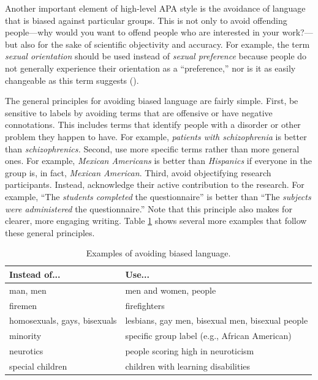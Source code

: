 \documentclass[
]{krantz}
\begin{document}
Another important element of high-level APA style is the avoidance of language that is biased against particular groups. This is not only to avoid offending people---why would you want to offend people who are interested in your work?---but also for the sake of scientific objectivity and accuracy. For example, the term \emph{sexual orientation} should be used instead of \emph{sexual preference} because people do not generally experience their orientation as a ``preference,'' nor is it as easily changeable as this term suggests ().

The general principles for avoiding biased language are fairly simple. First, be sensitive to labels by avoiding terms that are offensive or have negative connotations. This includes terms that identify people with a disorder or other problem they happen to have. For example, \emph{patients with schizophrenia} is better than \emph{schizophrenics.} Second, use more specific terms rather than more general ones. For example, \emph{Mexican Americans} is better than \emph{Hispanics} if everyone in the group is, in fact, \emph{Mexican American}. Third, avoid objectifying research participants. Instead, acknowledge their active contribution to the research. For example, ``The \emph{students completed} the questionnaire'' is better than ``The \emph{subjects were administered} the questionnaire.'' Note that this principle also makes for clearer, more engaging writing. Table \ref{tab:bias} shows several more examples that follow these general principles.

\begin{table}

\caption{\label{tab:bias}Examples of avoiding biased language.}
\centering
\begin{tabular}[t]{l|l}
\hline
Instead of... & Use...\\
\hline
man, men & men and women, people\\
\hline
firemen & firefighters\\
\hline
homosexuals, gays, bisexuals & lesbians, gay men, bisexual men, bisexual people\\
\hline
minority & specific group label (e.g., African American)\\
\hline
neurotics & people scoring high in neuroticism\\
\hline
special children & children with learning disabilities\\
\hline
\end{tabular}
\end{table}
\end{document}

